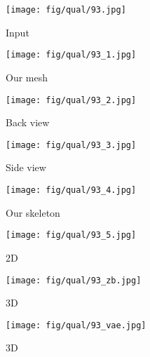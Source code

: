 \documentclass[10pt,twocolumn,letterpaper]{article}
\newcommand{\sze}{0.13}
\newcommand{\szle}{0.08}
\begin{document}
\begin{figure*}[h]
\begin{subfigure}[c]{\sze\linewidth}
\texttt{[image: fig/qual/93.jpg]}
\caption{Input}
\end{subfigure}
\begin{subfigure}[c]{\sze\linewidth}
\texttt{[image: fig/qual/93\_1.jpg]}
\caption{Our mesh}
\end{subfigure}
\begin{subfigure}[c]{\sze\linewidth}
\texttt{[image: fig/qual/93\_2.jpg]}
\caption{Back view}
\end{subfigure}
\begin{subfigure}[c]{\sze\linewidth}
\texttt{[image: fig/qual/93\_3.jpg]}
\caption{Side view}
\end{subfigure}
\begin{subfigure}[c]{\sze\linewidth}
\texttt{[image: fig/qual/93\_4.jpg]}
\caption{Our skeleton}
\end{subfigure}
\hspace{3pt}
\begin{subfigure}[c]{\sze\linewidth}
\texttt{[image: fig/qual/93\_5.jpg]}
\caption{\cite{zimmermann2017learning}2D}
\end{subfigure}
\begin{subfigure}[c]{\szle\linewidth}
\texttt{[image: fig/qual/93\_zb.jpg]}
\caption{\cite{zimmermann2017learning}3D}
\end{subfigure}
\hspace{3pt}
\begin{subfigure}[c]{\szle\linewidth}
\texttt{[image: fig/qual/93\_vae.jpg]}
\caption{\cite{spurr2018cross}3D}
\end{subfigure}

\end{figure*}
\end{document}
